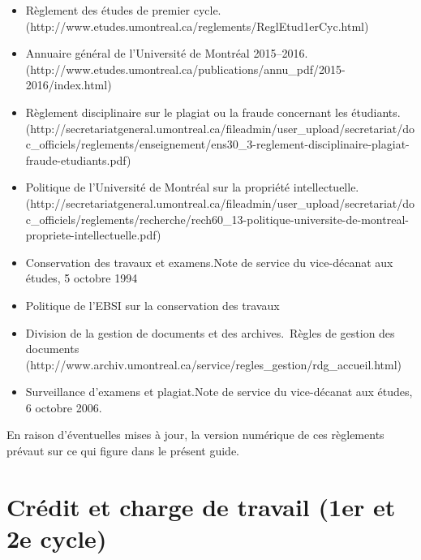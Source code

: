 \documentclass [12 pt]{article}
\begin{document}
        \begin{itemize}
        
                
        \item Règlement des études de premier cycle. (http://www.etudes.umontreal.ca/reglements/ReglEtud1erCyc.html)
                
        \item Annuaire général de l'Université de Montréal 2015–2016. (http://www.etudes.umontreal.ca/publications/annu_pdf/2015-2016/index.html)
                
        \item Règlement disciplinaire sur le plagiat ou la fraude concernant les étudiants.(http://secretariatgeneral.umontreal.ca/fileadmin/user_upload/secretariat/doc_officiels/reglements/enseignement/ens30_3-reglement-disciplinaire-plagiat-fraude-etudiants.pdf)
                
        \item Politique de l'Université de Montréal sur la propriété intellectuelle.(http://secretariatgeneral.umontreal.ca/fileadmin/user_upload/secretariat/doc_officiels/reglements/recherche/rech60_13-politique-universite-de-montreal-propriete-intellectuelle.pdf)
                
        \item Conservation des travaux et examens.Note de service du vice-décanat aux
                    études, 5 octobre 1994
                
        \item Politique de l'EBSI sur la conservation des travaux
                
        \item Division de la gestion de documents et des archives. Règles de gestion des
                    documents (http://www.archiv.umontreal.ca/service/regles_gestion/rdg_accueil.html)
                
        \item Surveillance d'examens et plagiat.Note de service du vice-décanat aux
                    études, 6 octobre 2006.
            
        \end{itemize}
    
            En raison d'éventuelles mises à jour, la version numérique de ces règlements prévaut
                sur ce qui figure dans le présent guide.
        
    
    
        \newpage
        \section {
        Crédit et charge de travail (1er et 2e cycle)
        }
        
\end{document}
